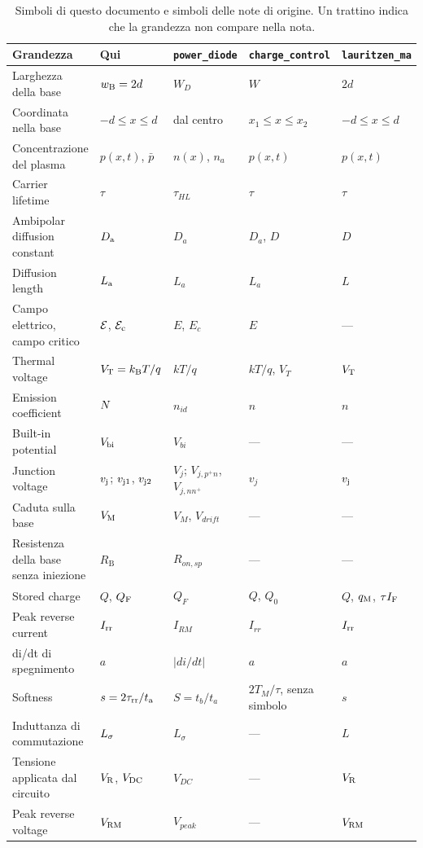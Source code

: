 \documentclass[10pt,a4paper]{scrartcl}
\let\newcommand\pdvaluedefine
\newcommand{\IF}{I_\mathrm{F}}
\newcommand{\VR}{V_\mathrm{R}}
\newcommand{\Irr}{I_\mathrm{rr}}
\newcommand{\ta}{t_\mathrm{a}}
\newcommand{\taurr}{\tau_\mathrm{rr}}
\newcommand{\qM}{q_\mathrm{M}}
\newcommand{\vj}{v_\mathrm{j}}
\newcommand{\vjo}{v_\mathrm{j1}}
\newcommand{\vjt}{v_\mathrm{j2}}
\newcommand{\VT}{V_\mathrm{T}}
\newcommand{\Vrm}{V_\mathrm{RM}}
\newcommand{\Nem}{N}                          %
\newcommand{\Ls}{L_\sigma}                    %
\newcommand{\Ef}{\mathcal{E}}                 %
\newcommand{\Ec}{\mathcal{E}_\mathrm{c}}      %
\newcommand{\wB}{w_\mathrm{B}}
\newcommand{\Da}{D_\mathrm{a}}
\newcommand{\La}{L_\mathrm{a}}
\newcommand{\VM}{V_\mathrm{M}}
\newcommand{\Vbi}{V_\mathrm{bi}}
\newcommand{\Vdc}{V_\mathrm{DC}}
\newcommand{\QF}{Q_\mathrm{F}}
\newcommand{\kB}{k_\mathrm{B}}
\begin{document}
\begin{table}[htb]
\centering\small
\caption{Simboli di questo documento e simboli delle note di origine. Un trattino indica che la grandezza non compare nella nota.}
\label{tab:origin}
\begin{tabular}{@{}>{\raggedright\arraybackslash}p{4.3cm}llll@{}}
\toprule
Grandezza & Qui & \texttt{power\_diode} & \texttt{charge\_control} & \texttt{lauritzen\_ma} \\
\midrule
Larghezza della base & $\wB = 2d$ & $W_D$ & $W$ & $2d$ \\
Coordinata nella base & $-d \leq x \leq d$ & dal centro & $x_1 \leq x \leq x_2$ & $-d \leq x \leq d$ \\
Concentrazione del plasma & $p(x,t)$, $\bar p$ & $n(x)$, $n_a$ & $p(x,t)$ & $p(x,t)$ \\
Carrier lifetime & $\tau$ & $\tau_{HL}$ & $\tau$ & $\tau$ \\
Ambipolar diffusion constant & $\Da$ & $D_a$ & $D_a$, $D$ & $D$ \\
Diffusion length & $\La$ & $L_a$ & $L_a$ & $L$ \\
Campo elettrico, campo critico & $\Ef$, $\Ec$ & $E$, $E_c$ & $E$ & --- \\
Thermal voltage & $\VT = \kB T/q$ & $kT/q$ & $kT/q$, $V_T$ & $\VT$ \\
Emission coefficient & $\Nem$ & $n_{id}$ & $n$ & $n$ \\
Built-in potential & $\Vbi$ & $V_{bi}$ & --- & --- \\
Junction voltage & $\vj$; $\vjo$, $\vjt$ & $V_j$; $V_{j,p^+n}$, $V_{j,nn^+}$ & $v_j$ & $\vj$ \\
Caduta sulla base & $\VM$ & $V_M$, $V_{drift}$ & --- & --- \\
Resistenza della base senza iniezione & $R_\mathrm{B}$ & $R_{on,sp}$ & --- & --- \\
Stored charge & $Q$, $\QF$ & $Q_F$ & $Q$, $Q_0$ & $Q$, $\qM$, $\tau\IF$ \\
Peak reverse current & $\Irr$ & $I_{RM}$ & $I_{rr}$ & $\Irr$ \\
di/dt di spegnimento & $a$ & $|di/dt|$ & $a$ & $a$ \\
Softness & $s = 2\taurr/\ta$ & $S = t_b/t_a$ & $2T_M/\tau$, senza simbolo & $s$ \\
Induttanza di commutazione & $\Ls$ & $L_\sigma$ & --- & $L$ \\
Tensione applicata dal circuito & $\VR$, $\Vdc$ & $V_{DC}$ & --- & $\VR$ \\
Peak reverse voltage & $\Vrm$ & $V_{peak}$ & --- & $\Vrm$ \\

\end{tabular}
\end{table}
\end{document}
